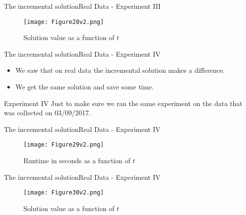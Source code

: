\documentclass{beamer}
\begin{document}
\begin{frame}{The incremental solution}{Real Data - Experiment III}
    \begin{figure}
        \centering
        \texttt{[image: Figure28v2.png]}
        \caption{Solution value as a function of $t$}
    \end{figure}
\end{frame}
\begin{frame}{The incremental solution}{Real Data - Experiment IV}
    \begin{itemize}
        \item {We saw that on real data the incremental solution makes a 
        difference.}
        \item {We get the same solution and save some time.}
    \end{itemize}
    \begin{block}{Experiment IV}
    Just to make sure we ran the same experiment on the data that was 
    collected on 03/09/2017. 
    \end{block}
\end{frame}

\begin{frame}{The incremental solution}{Real Data - Experiment IV}
    \begin{figure}
        \centering
        \texttt{[image: Figure29v2.png]}
        \caption{Runtime in seconds as a function of $t$}
    \end{figure}
\end{frame}

\begin{frame}{The incremental solution}{Real Data - Experiment IV}
    \begin{figure}
        \centering
        \texttt{[image: Figure30v2.png]}
        \caption{Solution value as a function of $t$}
    \end{figure}
\end{frame}

\end{document}
